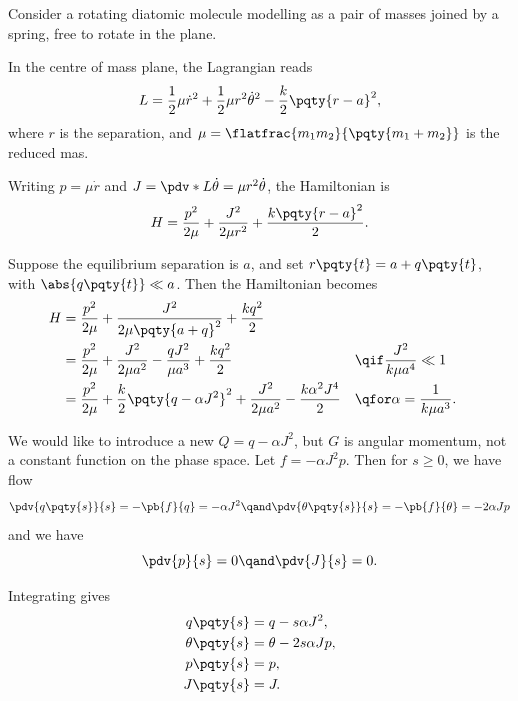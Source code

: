 \begin{example}
    Consider a rotating diatomic molecule modelling as a pair of masses joined by a spring, free to rotate in the plane.

    In the centre of mass plane, the Lagrangian reads
    \begin{equation}
        L = \frac{1}{2} \mu \dot{r}^2 + \frac{1}{2} \mu r^2 \dot{\theta}^2 - \frac{k}{2} \pqty{r - a}^2,
    \end{equation}
    where \(r\) is the separation, and \(\mu = \flatfrac{m_1 m_2}{\pqty{m_1 + m_2}}\) is the reduced mas.

    Writing \(p = \mu \dot{r}\) and \(J = \pdv*{L}{\dot{\theta}} = \mu r^2 \dot{\theta}\), the Hamiltonian is
    \begin{equation}
        H = \frac{p^2}{2 \mu} + \frac{J^2}{2 \mu r^2} + \frac{k \pqty{r - a}^2}{2}.
    \end{equation}

    Suppose the equilibrium separation is \(a\), and set \(r\pqty{t} = a + q\pqty{t}\), with \(\abs{q\pqty{t}} \ll a\). Then the Hamiltonian becomes
    \begin{subequations}
        \begin{align}
            H &= \frac{p^2}{2 \mu} + \frac{J^2}{2 \mu \pqty{a + q}^2} + \frac{k q^2}{2} \\
            &= \frac{p^2}{2 \mu} + \frac{J^2}{2 \mu a^2} - \frac{q J^2}{\mu a^3} + \frac{k q^2}{2} && \qif \frac{J^2}{k \mu a^4} \ll 1 \\
            &= \frac{p^2}{2 \mu} + \frac{k}{2} \pqty{q - \alpha J^2}^2 + \frac{J^2}{2 \mu a^2} - \frac{k \alpha^2 J^4}{2} && \qfor \alpha = \frac{1}{k \mu a^3}.
        \end{align}
    \end{subequations}

    We would like to introduce a new \(Q = q - \alpha J^2\), but \(G\) is angular momentum, not a constant function on the phase space. Let \(f = - \alpha J^2 p\). Then for \(s \geq 0\), we have flow
    \begin{equation}
        \pdv{q\pqty{s}}{s} = - \pb{f}{q} = - \alpha J^2 \qand \pdv{\theta\pqty{s}}{s} = - \pb{f}{\theta} = -2 \alpha J p
    \end{equation}
    and we have
    \begin{equation}
        \pdv{p}{s} = 0 \qand \pdv{J}{s} = 0.
    \end{equation}

    Integrating gives
    \begin{subequations}
        \begin{align}
            q\pqty{s} &= q - s \alpha J^2, \\
            \theta\pqty{s} &= \theta - 2 s \alpha J p, \\
            p\pqty{s} &= p, \\
            J\pqty{s} &= J.
        \end{align}
    \end{subequations}


\end{example}
